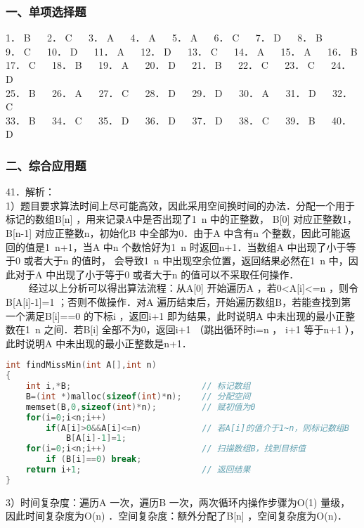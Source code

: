 \subsubsection{一、单项选择题}
1． B $\quad$ 2． C $\quad$ 3． A $\quad$ 4． A $\quad$ 5． A $\quad$ 6． C $\quad$ 7． D $\quad$ 8． B \\
9． C $\quad$ 10． D $\quad$ 11． A $\quad$ 12． D $\quad$ 13． C $\quad$ 14． A $\quad$ 15． A $\quad$ 16． B \\
17． C $\quad$ 18． B $\quad$ 19． A $\quad$ 20． D $\quad$ 21． B $\quad$ 22． C $\quad$ 23． C $\quad$ 24． D \\
25． B $\quad$ 26． A $\quad$ 27． C $\quad$ 28． D $\quad$ 29． D $\quad$ 30． A $\quad$ 31． D $\quad$ 32． C \\
33． B $\quad$ 34． C $\quad$ 35． D $\quad$ 36． D $\quad$ 37． D $\quad$ 38． C $\quad$ 39． B $\quad$ 40． D

\subsubsection{二、综合应用题}
41．解析： \\
1）题目要求算法时间上尽可能高效，因此采用空间换时间的办法．分配一个用于标记的数组B[n] ，用来记录A中是否出现了1~n 中的正整数， B[0] 对应正整数1，B[n-1] 对应正整数n，初始化B 中全部为0．由于A 中含有n 个整数，因此可能返回的值是1~n+1，当A 中n 个数恰好为1~n 时返回n+1．当数组A 中出现了小于等于0 或者大于n 的值时， 会导致1~n 中出现空余位置，返回结果必然在1~n 中，因此对于A 中出现了小于等于0 或者大于n 的值可以不采取任何操作． \\
$\qquad$ 经过以上分析可以得出算法流程：从A[0] 开始遍历A ，若0<A[i]<=n ，则令B[A[i]-1]=1 ；否则不做操作．对A 遍历结束后，开始遍历数组B，若能查找到第一个满足B[i]==0 的下标i ，返回i+1 即为结果，此时说明A 中未出现的最小正整数在1~n 之间．若B[i] 全部不为0，返回i+1 （跳出循环时i=n ， i+1 等于n+1 ），此时说明A 中未出现的最小正整数是n+1．
\begin{lstlisting}[language=cpp]
int findMissMin(int A[],int n)
{
    int i,*B;                          // 标记数组
    B=(int *)malloc(sizeof(int)*n);    // 分配空间
    memset(B,0,sizeof(int)*n);         // 赋初值为0
    for(i=0;i<n;i++)
        if(A[i]>0&&A[i]<=n)            // 若A[i]的值介于1~n，则标记数组B
            B[A[i]-1]=1;
    for(i=0;i<n;i++)                   // 扫描数组B，找到目标值
        if (B[i]==0) break;
    return i+1;                        // 返回结果
}
\end{lstlisting}
3）时间复杂度：遍历A 一次，遍历B 一次，两次循环内操作步骤为O(1) 量级，因此时间复杂度为O(n) ．空间复杂度：额外分配了B[n] ，空间复杂度为O(n)．

